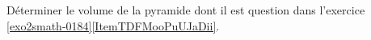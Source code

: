 
\begin{exercice}\label{exo2smath-0189}

    Déterminer le volume de la pyramide dont il est question dans l'exercice \ref{exo2smath-0184}\ref{ItemTDFMooPuUJaDii}.

\end{exercice}
